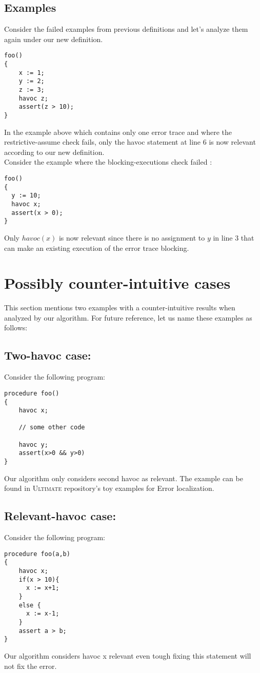 \documentclass{article}
\newcommand{\ultimate}{\textsc{Ultimate}\xspace} %
\begin{document}
\subsection{Examples}
Consider the failed examples from previous definitions and let's analyze them again under our new definition.
\begin{lstlisting}
foo()
{
	x := 1;
	y := 2;
	z := 3;
	havoc z;
	assert(z > 10);
}
\end{lstlisting}
In the example above which contains only one error trace and where the restrictive-assume check fails, only the havoc statement at line 6 is now relevant according to our new definition. \\
Consider the example where the blocking-executions check failed :
\begin{lstlisting}
foo()
{
  y := 10;
  havoc x;
  assert(x > 0);
}
\end{lstlisting}
Only $havoc(x)$ is now relevant since there is no assignment to $y$ in line 3 that can make an existing execution of the error trace blocking.


\section{Possibly counter-intuitive cases}
This section mentions two examples with a counter-intuitive results when analyzed by our algorithm. For future reference, let us name these examples as follows:
\subsection{Two-havoc case:}
Consider the following program:
\begin{lstlisting}
procedure foo()
{
	havoc x;
	
	// some other code	
	
	havoc y;
	assert(x>0 && y>0)
}
\end{lstlisting}
Our algorithm only considers second havoc as relevant. The example can be found in \ultimate repository's toy examples for Error localization.

\subsection{Relevant-havoc case:}
Consider the following program:
\begin{lstlisting}
procedure foo(a,b)
{
    havoc x;
    if(x > 10){
      x := x+1;
    }
    else {
      x := x-1;
    }
    assert a > b;
}
\end{lstlisting}
Our algorithm considers havoc x relevant even tough fixing this statement will not fix the error.
\end{document}
